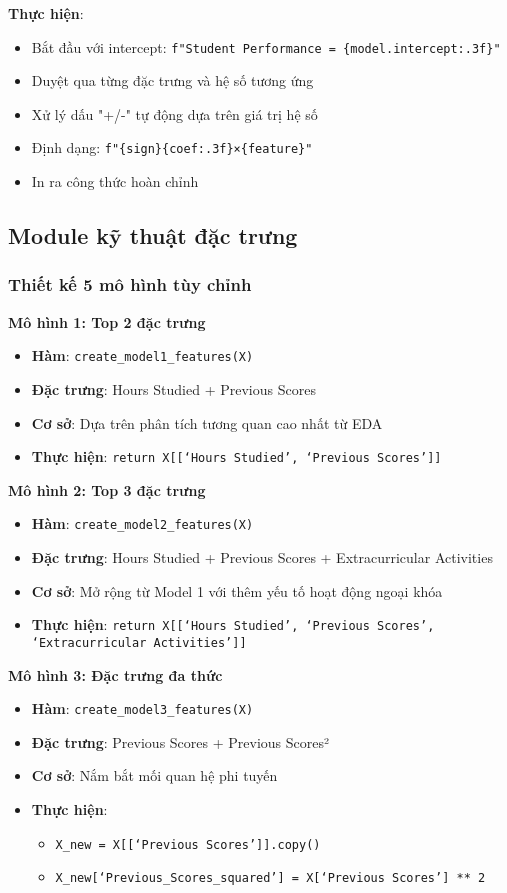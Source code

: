 \textbf{Thực hiện}:
\begin{itemize}
	\item Bắt đầu với intercept: \texttt{f"Student Performance = \{model.intercept:.3f\}"}
	\item Duyệt qua từng đặc trưng và hệ số tương ứng
	\item Xử lý dấu "+/-" tự động dựa trên giá trị hệ số
	\item Định dạng: \texttt{f"\{sign\}\{coef:.3f\}×\{feature\}"}
	\item In ra công thức hoàn chỉnh
\end{itemize}

\subsection{Module kỹ thuật đặc trưng}

\subsubsection{Thiết kế 5 mô hình tùy chỉnh}

\textbf{Mô hình 1: Top 2 đặc trưng}
\begin{itemize}
	\item \textbf{Hàm}: \texttt{create\_model1\_features(X)}
	\item \textbf{Đặc trưng}: Hours Studied + Previous Scores
	\item \textbf{Cơ sở}: Dựa trên phân tích tương quan cao nhất từ EDA
	\item \textbf{Thực hiện}: \texttt{return X[[`Hours Studied', `Previous Scores']]}
\end{itemize}

\textbf{Mô hình 2: Top 3 đặc trưng}
\begin{itemize}
	\item \textbf{Hàm}: \texttt{create\_model2\_features(X)}
	\item \textbf{Đặc trưng}: Hours Studied + Previous Scores + Extracurricular Activities
	\item \textbf{Cơ sở}: Mở rộng từ Model 1 với thêm yếu tố hoạt động ngoại khóa
	\item \textbf{Thực hiện}: \texttt{return X[[`Hours Studied', `Previous Scores', `Extracurricular Activities']]}
\end{itemize}

\textbf{Mô hình 3: Đặc trưng đa thức}
\begin{itemize}
	\item \textbf{Hàm}: \texttt{create\_model3\_features(X)}
	\item \textbf{Đặc trưng}: Previous Scores + Previous Scores²
	\item \textbf{Cơ sở}: Nắm bắt mối quan hệ phi tuyến
	\item \textbf{Thực hiện}:
	      \begin{itemize}
		      \item \texttt{X\_new = X[[`Previous Scores']].copy()}
		      \item \texttt{X\_new[`Previous\_Scores\_squared'] = X[`Previous Scores'] ** 2}
	      \end{itemize}
\end{itemize}

